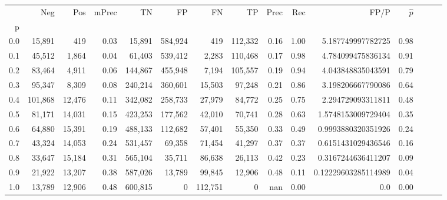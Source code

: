 \begin{tabular}{rrrrrrrrrrrrrrr}
\toprule
{} &      Neg &     Pos & mPrec &       TN &       FP &       FN &       TP &  Prec &   Rec &                 FP/P & $\hat{p}$ \\
p   &          &         &       &          &          &          &          &       &       &                      &           \\
\midrule
0.0 &   15,891 &     419 &  0.03 &   15,891 &  584,924 &      419 &  112,332 &  0.16 &  1.00 &    5.187749997782725 &      0.98 \\
0.1 &   45,512 &   1,864 &  0.04 &   61,403 &  539,412 &    2,283 &  110,468 &  0.17 &  0.98 &    4.784099475836134 &      0.91 \\
0.2 &   83,464 &   4,911 &  0.06 &  144,867 &  455,948 &    7,194 &  105,557 &  0.19 &  0.94 &    4.043848835043591 &      0.79 \\
0.3 &   95,347 &   8,309 &  0.08 &  240,214 &  360,601 &   15,503 &   97,248 &  0.21 &  0.86 &    3.198206667790086 &      0.64 \\
0.4 &  101,868 &  12,476 &  0.11 &  342,082 &  258,733 &   27,979 &   84,772 &  0.25 &  0.75 &    2.294729093311811 &      0.48 \\
0.5 &   81,171 &  14,031 &  0.15 &  423,253 &  177,562 &   42,010 &   70,741 &  0.28 &  0.63 &   1.5748153009729404 &      0.35 \\
0.6 &   64,880 &  15,391 &  0.19 &  488,133 &  112,682 &   57,401 &   55,350 &  0.33 &  0.49 &   0.9993880320351926 &      0.24 \\
0.7 &   43,324 &  14,053 &  0.24 &  531,457 &   69,358 &   71,454 &   41,297 &  0.37 &  0.37 &   0.6151431029436546 &      0.16 \\
0.8 &   33,647 &  15,184 &  0.31 &  565,104 &   35,711 &   86,638 &   26,113 &  0.42 &  0.23 &   0.3167244636411207 &      0.09 \\
0.9 &   21,922 &  13,207 &  0.38 &  587,026 &   13,789 &   99,845 &   12,906 &  0.48 &  0.11 &  0.12229603285114989 &      0.04 \\
1.0 &   13,789 &  12,906 &  0.48 &  600,815 &        0 &  112,751 &        0 &   nan &  0.00 &                  0.0 &      0.00 \\
\bottomrule
\end{tabular}
